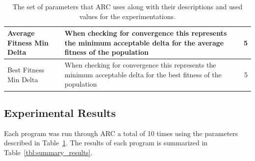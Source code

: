 \documentclass[10pt, conference, compsocconf]{IEEEtran}
\begin{document}
\begin{table}[!t]
\begin{center}
\begin{tabular}{|p{3cm}|p{10cm}|r|}
\\\hline
Average Fitness Min Delta & When checking for convergence this represents the minimum acceptable delta for the average fitness of the population & 5
\\\hline
Best Fitness Min Delta & When checking for convergence this represents the minimum acceptable delta for the best fitness of the population & 5 %
\\\hline
\end{tabular}
\caption{The set of parameters that ARC uses along with their descriptions and
used values for the experimentations.}
\label{tbl:used_parameters}
\end{center}
\end{table}

\subsection{Experimental Results}
\label{sec:experimental_results}

Each program was run through ARC a total of 10 times using the parameters
described in Table~\ref{tbl:used_parameters}. The results of each
program is summarized in Table~\ref{tbl:summary_results}. %
\end{document}
